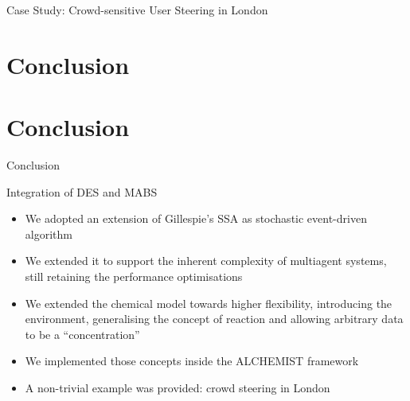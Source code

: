 \documentclass[presentation]{beamer} %
\newcommand{\alchemist}{{\sf ALCHEMIST}}
\begin{document}
\begin{frame}{Case Study: Crowd-sensitive User Steering in London}
\begin{center}
\end{center}
\end{frame}

\section*{Conclusion}


\section{Conclusion}
\begin{frame}{Conclusion}
  \begin{block}{Integration of DES and MABS}
    \begin{itemize}
      \item We adopted an extension of Gillespie's SSA as stochastic event-driven algorithm
      \item We extended it to support the inherent complexity of multiagent systems, still retaining the performance optimisations
      \item We extended the chemical model towards higher flexibility, introducing the environment, generalising the concept of reaction and allowing arbitrary data to be a ``concentration''
      \item We implemented those concepts inside the \alchemist{} framework
      \item A non-trivial example was provided: crowd steering in London
    \end{itemize}
  \end{block}
\end{frame}



\section*{\refname}
\begin{frame}[allowframebreaks]
  \frametitle{\refname}
  \scriptsize
  
  
\end{frame}
\section*{\refname}
\end{document}
